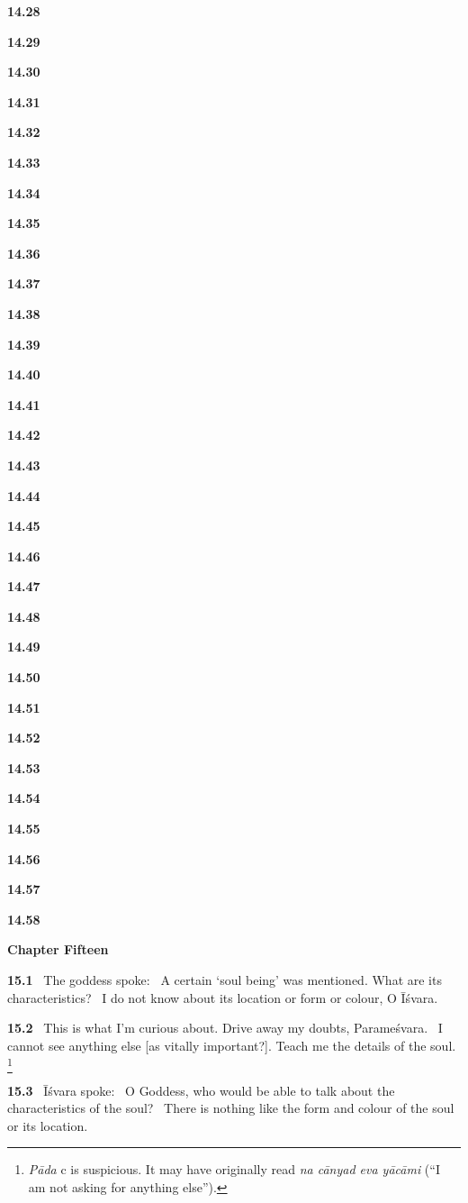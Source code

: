 \documentclass{article}
\newcommand{\skt}[1]{\textit{#1}}
\begin{document}
\textbf{14.28}%


\textbf{14.29}%


\textbf{14.30}%


\textbf{14.31}%


\textbf{14.32}%


\textbf{14.33}%


\textbf{14.34}%


\textbf{14.35}%


\textbf{14.36}%


\textbf{14.37}%


\textbf{14.38}%


\textbf{14.39}%


\textbf{14.40}%


\textbf{14.41}%


\textbf{14.42}%


\textbf{14.43}%


\textbf{14.44}%


\textbf{14.45}%


\textbf{14.46}%


\textbf{14.47}%


\textbf{14.48}%


\textbf{14.49}%


\textbf{14.50}%


\textbf{14.51}%


\textbf{14.52}%


\textbf{14.53}%


\textbf{14.54}%


\textbf{14.55}%


\textbf{14.56}%


\textbf{14.57}%


\textbf{14.58}%
\vfill\pagebreak\begin{center}{\large\textbf{Chapter Fifteen
}}\end{center}


\textbf{15.1}%
\ The goddess spoke:%
\ A certain `soul being' was mentioned. What are its characteristics?%
\                  I do not know about its location or form or colour, O Īśvara.%


\textbf{15.2}%
\ This is what I'm  curious about. Drive away my doubts, Parameśvara.%
\                  I cannot see anything else [as vitally important?]. Teach me the details of the soul.%
\footnote{\skt{Pāda} c is suspicious. It may have originally read \skt{na cānyad eva yācāmi} (``I am not asking for anything else''). }%


\textbf{15.3}%
\ Īśvara spoke:%
\ O Goddess, who would be able to talk about the characteristics of the soul?%
\                  There is nothing like the form and colour of the soul or its location.%
\end{document}
